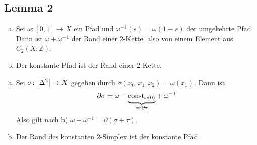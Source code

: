 \subsection[Lemma 2: $\omega + \omega ^{-1}$ und der konstante Pfad sind im Rand einer $2$-Kette]{Lemma 2} %
\label{sub:157}
\begin{enumerate}[a)]
	\item Sei $\omega \colon [0,1] \to X$ ein Pfad und $\omega ^{-1}(s) = \omega(1-s)$ der umgekehrte Pfad. Dann ist $\omega + \omega ^{-1}$ der Rand einer $2$-Kette, also 
	von einem Element aus $C_2(X;\mathds{Z})$.
	\item Der konstante Pfad ist der Rand einer $2$-Kette.
\end{enumerate}
\begin{enumerate}[a)]
	\item Sei $\sigma \colon \abs*{\Delta^2} \to X$ gegeben durch $\sigma(x_0,x_1,x_2) = \omega(x_1)$. Dann ist 
	\[
		\partial \sigma = \omega- {\underbrace{\mathrm{const}_{\omega(0)}}_{=: \partial \tau}} + \omega^{-1}
	\]
	Also gilt nach b) $\omega + \omega ^{-1} = \partial(\sigma+\tau)$.
	\item Der Rand des konstanten $2$-Simplex ist der konstante Pfad. \bewende
\end{enumerate}
\begin{figure}[ht]
\end{figure}


